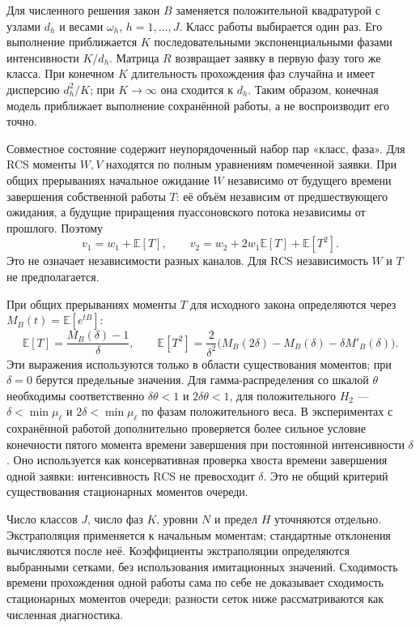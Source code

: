 Для численного решения закон \(B\) заменяется положительной квадратурой с узлами \(d_h\) и весами \(\omega_h\), \(h=1,\ldots,J\). Класс работы выбирается один раз. Его выполнение приближается \(K\) последовательными экспоненциальными фазами интенсивности \(K/d_h\). Матрица \(R\) возвращает заявку в первую фазу того же класса. При конечном \(K\) длительность прохождения фаз случайна и имеет дисперсию \(d_h^2/K\); при \(K\to\infty\) она сходится к \(d_h\). Таким образом, конечная модель приближает выполнение сохранённой работы, а не воспроизводит его точно.

Совместное состояние содержит неупорядоченный набор пар «класс, фаза». Для RCS моменты \(W,V\) находятся по полным уравнениям помеченной заявки. При общих прерываниях начальное ожидание \(W\) независимо от будущего времени завершения собственной работы \(T\): её объём независим от предшествующего ожидания, а будущие приращения пуассоновского потока независимы от прошлого. Поэтому
\[
v_1=w_1+\mathbb E[T],\qquad
v_2=w_2+2w_1\mathbb E[T]+\mathbb E[T^2].
\]
Это не означает независимости разных каналов. Для RCS независимость \(W\) и \(T\) не предполагается.

При общих прерываниях моменты \(T\) для исходного закона определяются через \(M_B(t)=\mathbb E[e^{tB}]\):
\[
\mathbb E[T]=\frac{M_B(\delta)-1}{\delta},\qquad
\mathbb E[T^2]=\frac{2}{\delta^2}\bigl(M_B(2\delta)-M_B(\delta)-\delta M'_B(\delta)\bigr).
\]
Эти выражения используются только в области существования моментов; при \(\delta=0\) берутся предельные значения. Для гамма-распределения со шкалой \(\theta\) необходимы соответственно \(\delta\theta<1\) и \(2\delta\theta<1\), для положительного \(H_2\) --- \(\delta<\min\mu_\ell\) и \(2\delta<\min\mu_\ell\) по фазам положительного веса. В экспериментах с сохранённой работой дополнительно проверяется более сильное условие конечности пятого момента времени завершения при постоянной интенсивности \(\delta\). Оно используется как консервативная проверка хвоста времени завершения одной заявки: интенсивность RCS не превосходит \(\delta\). Это не общий критерий существования стационарных моментов очереди.

Число классов \(J\), число фаз \(K\), уровни \(N\) и предел \(H\) уточняются отдельно. Экстраполяция применяется к начальным моментам; стандартные отклонения вычисляются после неё. Коэффициенты экстраполяции определяются выбранными сетками, без использования имитационных значений. Сходимость времени прохождения одной работы сама по себе не доказывает сходимость стационарных моментов очереди; разности сеток ниже рассматриваются как численная диагностика.

